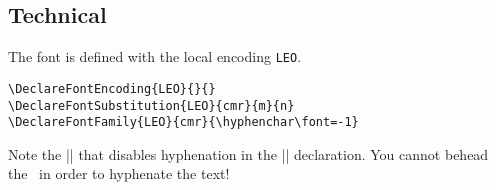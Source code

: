 \subsection{Technical}

The font is defined with the local encoding \texttt{LEO}. 

\begin{verbatim}
\DeclareFontEncoding{LEO}{}{}
\DeclareFontSubstitution{LEO}{cmr}{m}{n}
\DeclareFontFamily{LEO}{cmr}{\hyphenchar\font=-1}
\end{verbatim}

Note the |\hyphenchar{}| that disables hyphenation in the |\DeclareFontFamily|  declaration. You cannot behead the \EOofficerII\ in order to hyphenate the text!


